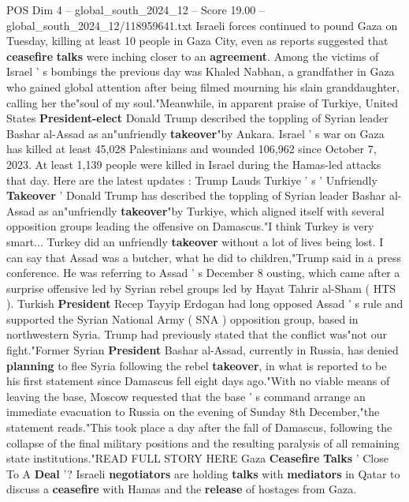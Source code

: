 \begin{textsample}{POS Dim 4 – global\_south\_2024\_12 – Score 19.00 – global\_south\_2024\_12/118959641.txt}  \label{ex:f4_pos_258}
Israeli forces continued to pound Gaza on Tuesday, killing at least 10 people in Gaza City, even as reports suggested that \textbf{ceasefire} \textbf{talks} were inching closer to an \textbf{agreement}.
Among the victims of Israel ' s bombings the previous day was Khaled Nabhan, a grandfather in Gaza who gained global attention after being filmed mourning his slain granddaughter, calling her the"soul of my soul."Meanwhile, in apparent praise of Turkiye, United States \textbf{President-elect} Donald Trump described the toppling of Syrian leader Bashar al-Assad as an"unfriendly \textbf{takeover}"by Ankara.
Israel ' s war on Gaza has killed at least 45,028 Palestinians and wounded 106,962 since October 7, 2023.
At least 1,139 people were killed in Israel during the Hamas-led attacks that day.
Here are the latest updates : Trump Lauds Turkiye ' s ' Unfriendly \textbf{Takeover} ' Donald Trump has described the toppling of Syrian leader Bashar al-Assad as an"unfriendly \textbf{takeover}"by Turkiye, which aligned itself with several opposition groups leading the offensive on Damascus."I think Turkey is very smart...
Turkey did an unfriendly \textbf{takeover} without a lot of lives being lost.
I can say that Assad was a butcher, what he did to children,"Trump said in a press conference.
He was referring to Assad ' s December 8 ousting, which came after a surprise offensive led by Syrian rebel groups led by Hayat Tahrir al-Sham ( HTS ).
Turkish \textbf{President} Recep Tayyip Erdogan had long opposed Assad ' s rule and supported the Syrian National Army ( SNA ) opposition group, based in northwestern Syria.
Trump had previously stated that the conflict was"not our fight."Former Syrian \textbf{President} Bashar al-Assad, currently in Russia, has denied \textbf{planning} to flee Syria following the rebel \textbf{takeover}, in what is reported to be his first statement since Damascus fell eight days ago."With no viable means of leaving the base, Moscow requested that the base ' s command arrange an immediate evacuation to Russia on the evening of Sunday 8th December,"the statement reads."This took place a day after the fall of Damascus, following the collapse of the final military positions and the resulting paralysis of all remaining state institutions."READ FULL STORY HERE Gaza \textbf{Ceasefire} \textbf{Talks} ' Close To A \textbf{Deal} '?
Israeli \textbf{negotiators} are holding \textbf{talks} with \textbf{mediators} in Qatar to discuss a \textbf{ceasefire} with Hamas and the \textbf{release} of hostages from Gaza.

\end{textsample}
